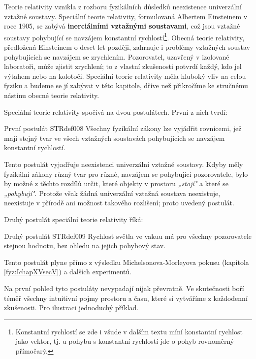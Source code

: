 
      Teorie relativity vznikla z rozboru fyzikálních důsledků neexistence univerzální vztažné
      soustavy. Speciální teorie relativity, formulovaná Albertem Einsteinem v roce 1905, se zabývá
      \textbf{inerciálními vztažnými soustavami}, což jsou vztažné soustavy pohybující se navzájem
      konstantní rychlostí\footnote{Konstantní rychlostí se zde i všude v dalším textu míní
      konstantní rychlost jako vektor, tj. u pohybu s konstantní rychlostí jde o pohyb rovnoměrný
      přímočarý.}. Obecná teorie relativity, předložená Einsteinem o deset let později, zahrnuje i
      problémy vztažných soustav pohybujících se navzájem se zrychlením. Pozorovatel, uzavřený v
      izolované laboratoři, může zjistit zrychlení; to z vlastní zkušenosti potvrdí každý, kdo jel
      výtahem nebo na kolotoči. Speciální teorie relativity měla hluboký vliv na celou fyziku a
      budeme se jí zabývat v této kapitole, dříve než přikročíme ke stručnému nástinu obecné teorie
      relativity.

      Speciální teorie relativity spočívá na dvou postulátech. První z nich tvrdí: 
      \begin{fyzdef}{První postulát STR}{def008}
        Všechny fyzikální zákony lze vyjádřit rovnicemi, jež mají stejný tvar ve všech vztažných
        soustavách pohybujících se navzájem konstantní rychlostí. 
      \end{fyzdef}
      Tento postulát vyjadřuje neexistenci univerzální vztažné soustavy. Kdyby měly fyzikální zákony
      různý tvar pro různé, navzájem se pohybující pozorovatele, bylo by možné z těchto rozdílů
      určit, které objekty v prostoru \emph{„stojí"} a které se \emph{„pohybují"}. Protože však
      žádná univerzální vztažná soustava neexistuje, neexistuje v přírodě ani možnost takového
      rozlišení; proto uvedený postulát.

      Druhý postulát speciální teorie relativity říká:
      \begin{fyzdef}{Druhý postulát STR}{def009}
        Rychlost světla ve vakuu má pro všechny pozorovatele stejnou hodnotu, bez ohledu na jejich 
        pohybový stav. 
      \end{fyzdef}
      Tento postulát plyne přímo z výsledku Michelsonova-Morleyova pokusu (kapitola
      \ref{fyz:IchapXVsecV}) a dalších experimentů.

      Na první pohled tyto postuláty nevypadají nijak převratně. Ve skutečnosti boří téměř všechny
      intuitivní pojmy prostoru a času, které si vytváříme z každodenní zkušenosti. Pro ilustraci
      jednoduchý příklad. 
      

